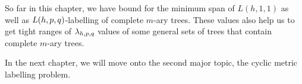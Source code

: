 So far in this chapter, we have bound for the minimum span of $L(h,1,1)$ as well as $L(h,p,q)$-labelling  of complete $m$-ary trees. These values also help us to get tight ranges of $\lambda_{h,p,q}$ values of some general sets of trees that contain complete $m$-ary trees. 

In the next chapter, we will move onto the second major topic, the cyclic metric labelling problem. 
